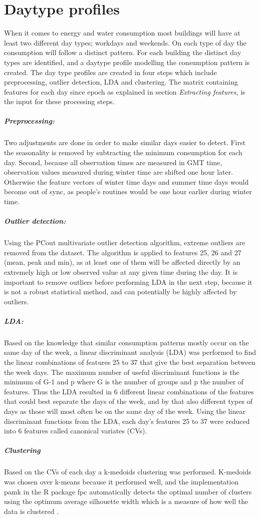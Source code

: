 \section*{Daytype profiles}
When it comes to energy and water consumption most buildings will have at least two different day types; workdays and weekends. On each type of day the consumption will follow a distinct pattern. For each building the distinct day types are identified, and a daytype profile modelling the consumption pattern is created. The day type profiles are created in four steps which include preprocessing, outlier detection, LDA and clustering. The matrix containing features for each day since epoch as explained in section \emph{Extracting features}, is the input for these processing steps.
\subparagraph{Preprocessing:}Two adjustments are done in order to make similar days easier to detect. First the seasonality is removed by subtracting the minimum consumption for each day. Second, because all observation times are measured in GMT time, observation values measured during winter time are shifted one hour later. Otherwise the feature vectors of winter time days and summer time days would become out of sync, as people's routines would be one hour earlier during winter time. 
\subparagraph{Outlier detection:}Using the PCout multivariate outlier detection algorithm, extreme outliers are removed from the dataset. The algorithm is applied to features 25, 26 and 27 (mean, peak and min), as at least one of them will be affected directly by an extremely high or low observed value at any given time during the day. It is important to remove outliers before performing LDA in the next step, because it is not a robust statistical method, and can potentially be highly affected by outliers.
\subparagraph{LDA:} Based on the knowledge that similar consumption patterns mostly occur on the same day of the week, a linear discriminant analysis (LDA) was performed to find the linear combinations of features 25 to 37 that give the best separation between the week days. The maximum number of useful discriminant functions is the minimum of G-1 and p where G is the number of groups and p the number of features. Thus the LDA resulted in 6 different linear combinations of the features that could best separate the days of the week, and by that also different types of days as those will most often be on the same day of the week. Using the linear discriminant functions from the LDA, each day’s features 25 to 37 were reduced into 6 features called canonical variates (CVs).
\subparagraph{Clustering}Based on the CVs of each day a k-medoids clustering was performed. K-medoids was chosen over k-means because it performed well, and the implementation pamk in the R package fpc automatically detects the optimal number of clusters using the optimum average silhouette width which is a measure of how well the data is clustered \cite{PeterJRousseeuw}. 

